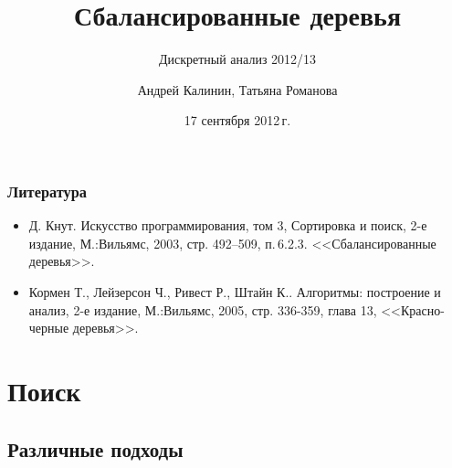 \documentclass[hyperref={unicode=true}]{beamer}
\title{Сбалансированные деревья}
\subtitle{Дискретный анализ 2012/13}
\author{Андрей Калинин, Татьяна Романова}
\date{17 сентября 2012\,г. }
\begin{document}
\newcommand{\tnd}[1]{\Tcircle{\makebox[5mm][c]{#1}}}
\newcommand{\nilnd} {\Tp[edge=none]}
\newcommand{\rednd}[1]{\Tcircle[linecolor=red!30, %
    fillstyle=solid, fillcolor=red!30] {\makebox[5mm][c]{#1}}}
\newcommand{\blacknd}[1]{\Tcircle[linecolor=black!20, %
    fillstyle=solid, fillcolor=black!20]{\makebox[5mm][c]{#1}}}

\frame {\titlepage}


\frame
{
  \frametitle{Литература}

  \begin{itemize}
  \item Д. Кнут. Искусство программирования, том 3, Сортировка и поиск, 2-е издание,
  М.:Вильямс, 2003, стр. 492--509, п.\,6.2.3. <<Сбалансированные деревья>>.
  \item  Кормен Т., Лейзерсон Ч., Ривест Р., Штайн К.. Алгоритмы:
    построение и анализ, 2-е издание, М.:Вильямс, 2005, стр. 336-359, глава 13,
    <<Красно-черные деревья>>. 
  \end{itemize}
}

\frame{\tableofcontents}

\section{Поиск}

\subsection{Различные подходы}

\end{document}
